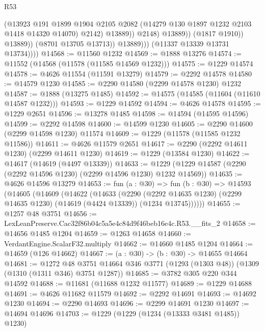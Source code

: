 \begin{lexlean}{R53}
\begin{coremodule}
                                  (@13923
                                    @191
                                    @1899
                                    @1904
                                    @2105
                                    @2082
                                    (@14279 @130 @1897 @1232 @2103 @1418 @14320 @14070)
                                    @2142)
                                  @13889))
                              @2148)
                            @13889))
                        (@1817 @1910))
                      @13889))
                  (@8701 @13705 @13713))
                @13889)))
          (@11337 @13339 @13731 @13734))))
@14568 := @11560 @1232
@14569 := @1888 @13276
@14574 := @11552 (@14568 (@11578 (@11585 @14569 @1232)))
@14575 := @1229 @14574
@14578 := @4626 @11554 (@11591 @13279)
@14579 := @2292 @14578
@14580 := @14579 @1230
@14585 := @2290 @14580 (@2299 @14578 @1230) @1232
@14587 := @1888 (@13275 @1485)
@14592 := @14575 (@14585 (@11604 (@11610 @14587 @1232)))
@14593 := @1229 @14592
@14594 := @4626 @14578
@14595 := @1229 @2651
@14596 := @13278 @1485
@14598 := @14594 (@14595 @14596)
@14599 := @2292 @14598
@14600 := @14599 @1230
@14605 := @2290 @14600 (@2299 @14598 @1230) @11574
@14609 := @1229 (@11578 (@11585 @1232 @11586))
@14611 := @4626 @11579 @2651
@14617 := @2290 (@2292 @14611 @1230) (@2299 @14611 @1230)
@14619 := @1229 (@13584 @1230)
@14622 := @14617 (@14619 (@4497 @13339))
@14633 := @1229 (@1229 @14587 (@2290 (@2292 @14596 @1230) (@2299 @14596 @1230) @1232 @14569))
@14635 := @4626 @14596 @13279
@14653 := fun (a : @30) =>
  fun (b : @30) =>
  @14593
    (@14605
      (@14609
        (@14622
          (@14633
            (@2290
              (@2292 @14635 @1230)
              (@2299 @14635 @1230)
              (@14619 (@4424 @13339))
              (@1234 @13745))))))
@14655 := @1257 @48 @3751
@14656 := LexLeanPreserve.Cac32f86b04c5a5e4c84d9f46beb16e4c.R53.__fits_2
@14658 := @14656 @1485 @1204
@14659 := @1263 @14658
@14660 := VerdantEngine.ScalarF32.multiply
@14662 := @14660 @1485 @1204
@14664 := @14659 (@126 @14662)
@14667 := (a : @30) -> (b : @30) -> @14655 @14664
@14681 := @1272
    @48
    @3751
    @14664
    @346
    @3771
    (@1293 (@1303 @48))
    (@1309 (@1310 (@1311 @346) @3751 @1287))
@14685 := @3782 @305 @220 @344 @14592
@14688 := @11681 (@11688 @1232 @11577)
@14689 := @1229 @14688
@14691 := @4626 @11682 @11579
@14692 := @2292 @14691
@14693 := @14692 @1230
@14694 := @2290 @14693
@14696 := @2299 @14691 @1230
@14697 := @14694 @14696
@14703 := @1229 (@1229 (@1234 (@13333 @3481 @1485)) @1230)

\end{coremodule}
\end{lexlean}
